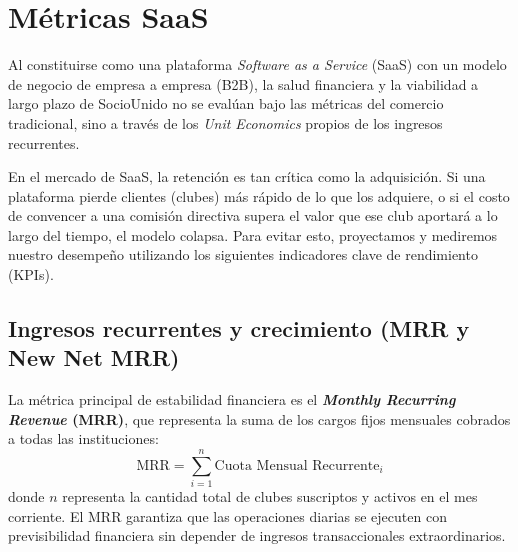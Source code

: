 \section{Métricas SaaS}

Al constituirse como una plataforma \textit{Software as a Service} (SaaS) con un modelo de negocio de empresa a empresa (B2B), la salud financiera y la viabilidad a largo plazo de SocioUnido no se evalúan bajo las métricas del comercio tradicional, sino a través de los \textit{Unit Economics} propios de los ingresos recurrentes.

En el mercado de SaaS, la retención es tan crítica como la adquisición. Si una plataforma pierde clientes (clubes) más rápido de lo que los adquiere, o si el costo de convencer a una comisión directiva supera el valor que ese club aportará a lo largo del tiempo, el modelo colapsa. Para evitar esto, proyectamos y mediremos nuestro desempeño utilizando los siguientes indicadores clave de rendimiento (KPIs).

\subsection{Ingresos recurrentes y crecimiento (MRR y New Net MRR)}

La métrica principal de estabilidad financiera es el \textbf{\textit{Monthly Recurring Revenue} (MRR)}, que representa la suma de los cargos fijos mensuales cobrados a todas las instituciones:
\begin{equation}
    \text{MRR} = \sum_{i=1}^{n} \text{Cuota Mensual Recurrente}_i
\end{equation}
donde $n$ representa la cantidad total de clubes suscriptos y activos en el mes corriente. El MRR garantiza que las operaciones diarias se ejecuten con previsibilidad financiera sin depender de ingresos transaccionales extraordinarios.

